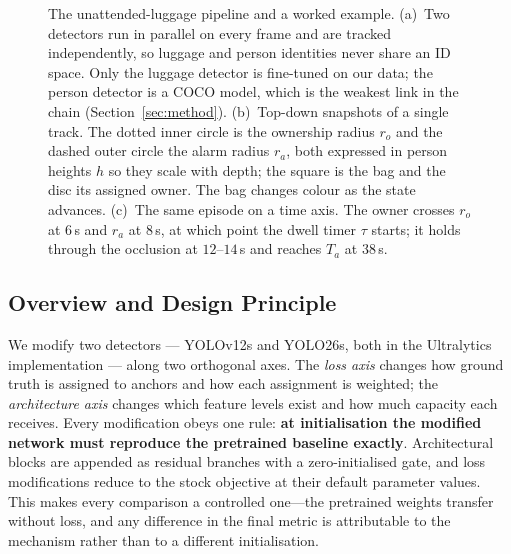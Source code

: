 \documentclass[10pt,twocolumn,a4paper]{article}
\begin{document}
\begin{figure}[t]
\fi
\caption{The unattended-luggage pipeline and a worked example.
(a)~Two detectors run in parallel on every frame and are tracked independently,
so luggage and person identities never share an ID space. Only the luggage
detector is fine-tuned on our data; the person detector is a COCO model, which is
the weakest link in the chain (Section~\ref{sec:method}).
(b)~Top-down snapshots of a single track. The dotted inner circle is the
ownership radius $r_o$ and the dashed outer circle the alarm radius $r_a$, both
expressed in person heights $h$ so they scale with depth; the square is the bag
and the disc its assigned owner. The bag changes colour as the state advances.
(c)~The same episode on a time axis. The owner crosses $r_o$ at $6$\,s and $r_a$
at $8$\,s, at which point the dwell timer $\tau$ starts; it holds through the
occlusion at $12$--$14$\,s and reaches $T_a$ at $38$\,s.}
\label{fig:pipeline}
\end{figure}

\subsection{Overview and Design Principle}
\label{sec:method:overview}

We modify two detectors --- YOLOv12s \cite{tian2025yolov12} and YOLO26s, both in
the Ultralytics implementation \cite{ultralytics} --- along two orthogonal axes. The \emph{loss axis} changes
how ground truth is assigned to anchors and how each assignment is weighted; the
\emph{architecture axis} changes which feature levels exist and how much capacity
each receives. Every modification obeys one rule: \textbf{at initialisation the
modified network must reproduce the pretrained baseline exactly}. Architectural
blocks are appended as residual branches with a zero-initialised gate, and loss
modifications reduce to the stock objective at their default parameter values.
This makes every comparison a controlled one---the pretrained weights transfer
without loss, and any difference in the final metric is attributable to the
mechanism rather than to a different initialisation.
\end{document}
